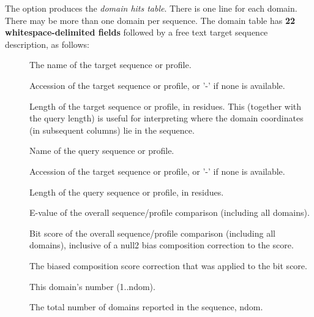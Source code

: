 The  option produces the \emph{domain hits
  table}. There is one line for each domain. There may be more than
one domain per sequence. The domain table has \textbf{22
  whitespace-delimited fields} followed by a free text target sequence
description, as follows:

\begin{description}
\item[] The name of the target sequence or  profile.

\item[] Accession of the target sequence
  or profile, or '-' if none is available. 

\item[] Length of the target sequence or profile, in residues. 
  This (together with the query length) is useful for interpreting
  where the domain coordinates (in subsequent columns) lie in the
  sequence.

\item[] Name of the query sequence or profile.

\item[] Accession of the target sequence or
  profile, or '-' if none is available.

\item[]  Length of the query sequence or profile, in residues.

\item[] E-value of the overall sequence/profile
  comparison (including all domains).

\item[] Bit score of the overall sequence/profile
  comparison (including all domains), inclusive of a null2 bias
  composition correction to the score.

\item[] The biased composition score correction that
  was applied to the bit score.

\item[] This domain's number (1..ndom).

\item[] The total number of domains reported in the
  sequence, ndom.


\end{description}
